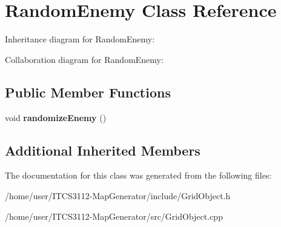 \hypertarget{classRandomEnemy}{}\section{Random\+Enemy Class Reference}
\label{classRandomEnemy}


Inheritance diagram for Random\+Enemy\+:


Collaboration diagram for Random\+Enemy\+:
\subsection*{Public Member Functions}
\begin{DoxyCompactItemize}
\item 
\mbox{\label{classRandomEnemy_a6f3a4c15f1d3adca1bebc0fa0e306cae}} 
void {\bfseries randomize\+Enemy} ()
\end{DoxyCompactItemize}
\subsection*{Additional Inherited Members}


The documentation for this class was generated from the following files\+:\begin{DoxyCompactItemize}
\item 
/home/user/\+I\+T\+C\+S3112-\/\+Map\+Generator/include/Grid\+Object.\+h\item 
/home/user/\+I\+T\+C\+S3112-\/\+Map\+Generator/src/Grid\+Object.\+cpp\end{DoxyCompactItemize}
